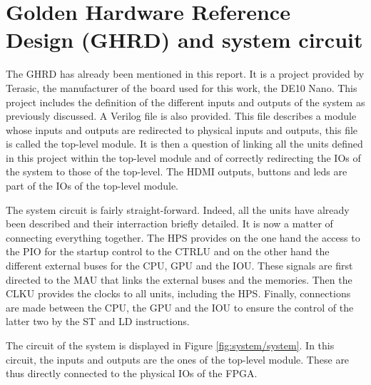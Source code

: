 \section{Golden Hardware Reference Design (GHRD) and system circuit}

The GHRD has already been mentioned in this report. It is a project provided by Terasic, the 
manufacturer of the board used for this work, the DE10 Nano. This project includes the definition 
of the different inputs and outputs of the system as previously discussed. A Verilog file is also 
provided. This file describes a module whose inputs and outputs are redirected to physical inputs 
and outputs, this file is called the top-level module. It is then a question of linking all the 
units defined in this project within the top-level module and of correctly redirecting the IOs of 
the system to those of the top-level. The HDMI outputs, buttons and leds are part of the IOs of the
top-level module.

The system circuit is fairly straight-forward. Indeed, all the units have already been described 
and their interraction briefly detailed. It is now a matter of connecting everything together. The 
HPS provides on the one hand the access to the PIO for the startup control to the CTRLU and 
on the other hand the different external buses for the CPU, GPU and the IOU. These signals are first
directed to the MAU that links the external buses and the memories. Then the CLKU provides the 
clocks to all units, including the HPS. Finally, connections are made between the CPU, the GPU and 
the IOU to ensure the control of the latter two by the ST and LD instructions.

The circuit of the system is displayed in Figure \ref{fig:system/system}. In this circuit, the inputs
and outputs are the ones of the top-level module. These are thus directly connected to the physical
IOs of the FPGA.

